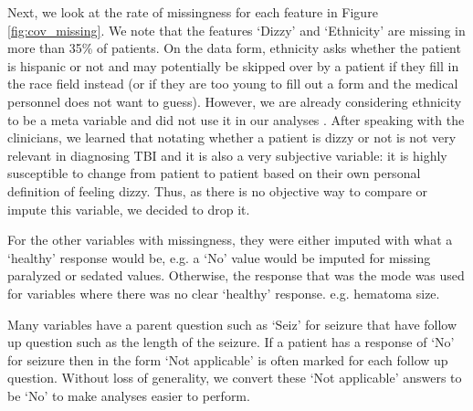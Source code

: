 \documentclass[11pt, letterpaper]{amsart}
\begin{document}
Next, we look at the rate of missingness for each feature in Figure \ref{fig:cov_missing}. We note that the features `Dizzy' and `Ethnicity' are missing in more than 35\% of patients. On the data form, ethnicity asks whether the patient is hispanic or not and may potentially be skipped over by a patient if they fill in the race field instead (or if they are too young to fill out a form and the medical personnel does not want to guess). However, we are already considering ethnicity to be a meta variable and did not use it in our analyses . After speaking with the clinicians, we learned that notating whether a patient is dizzy or not is not very relevant in diagnosing TBI and it is also a very subjective variable: it is highly susceptible to change from patient to patient based on their own personal definition of feeling dizzy. Thus, as there is no objective way to compare or impute this variable, we decided to drop it.

For the other variables with missingness, they were either imputed with what a `healthy' response would be, e.g. a `No' value would be imputed for missing paralyzed or sedated values. Otherwise, the response that was the mode was used for variables where there was no clear `healthy' response. e.g. hematoma size.

Many variables have a parent question such as `Seiz' for seizure that have follow up question such as the length of the seizure. If a patient has a response of `No' for seizure then in the form `Not applicable' is often marked for each follow up question. Without loss of generality, we convert these `Not applicable' answers to be `No' to make analyses easier to perform.
\end{document}
